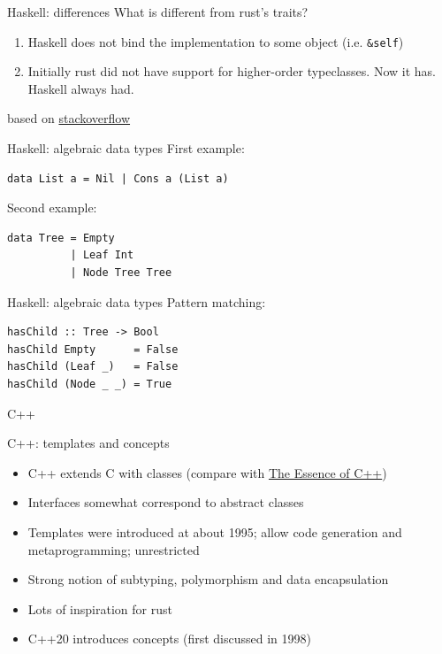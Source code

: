 \documentclass{beamer}
\begin{document}
\begin{frame}[fragile]{Haskell: differences}
  What is different from rust's traits?
  \begin{enumerate}
    \item Haskell does not bind the implementation to some object (i.e. \texttt{&self})
    \item Initially rust did not have support for higher-order typeclasses. Now it has. Haskell always had.
  \end{enumerate}

  based on \href{https://stackoverflow.com/a/32659986}{stackoverflow}
\end{frame}

\begin{frame}[fragile]{Haskell: algebraic data types}
  First example:
  \begin{verbatim}
data List a = Nil | Cons a (List a)
  \end{verbatim}

  Second example:
  \begin{verbatim}
data Tree = Empty
          | Leaf Int
          | Node Tree Tree
  \end{verbatim}
\end{frame}

\begin{frame}[fragile]{Haskell: algebraic data types}
  Pattern matching:
  \begin{verbatim}
hasChild :: Tree -> Bool
hasChild Empty      = False
hasChild (Leaf _)   = False
hasChild (Node _ _) = True
  \end{verbatim}
\end{frame}

\begin{frame}[standout]
  C++
\end{frame}

\begin{frame}[fragile]{C++: templates and concepts}
  \begin{itemize}
    \item C++ extends C with classes (compare with \href{https://www.youtube.com/watch?v=86xWVb4XIyE}{The Essence of C++})
    \item Interfaces somewhat correspond to abstract classes %
    \item Templates were introduced at about 1995; allow code generation and metaprogramming; unrestricted
    \item Strong notion of subtyping, polymorphism and data encapsulation
    \item Lots of inspiration for rust
    \item C++20 introduces concepts (first discussed in 1998)
  \end{itemize}
\end{frame}
\end{document}
